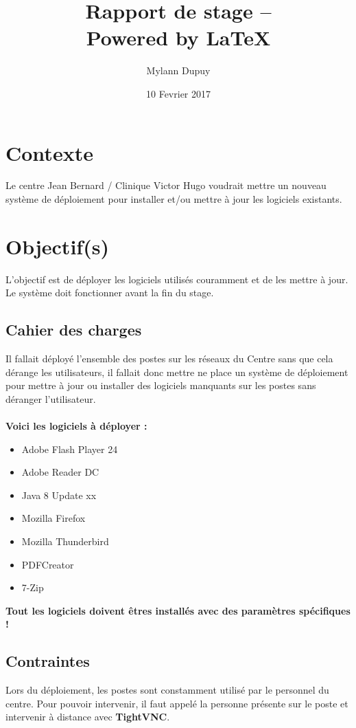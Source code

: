 \documentclass[11pt,a4paper,oneside]{article}
\author{Mylann Dupuy}
\title{Rapport de stage --  \\ Powered by \LaTeX}
\date{10 Fevrier 2017}
\begin{document}
\maketitle
\newpage
\tableofcontents
\newpage
\section{Contexte}
Le centre Jean Bernard / Clinique Victor Hugo voudrait mettre un nouveau système de déploiement pour installer et/ou mettre à jour les logiciels existants.

\section{Objectif(s)}
L'objectif est de déployer les logiciels utilisés couramment et de les mettre à jour. Le système doit fonctionner avant la fin du stage. 

\subsection{Cahier des charges}
Il fallait déployé l'ensemble des postes sur les réseaux du Centre sans que cela dérange les utilisateurs, il fallait donc mettre ne place un système de déploiement pour mettre à jour ou installer des logiciels manquants sur les postes sans déranger l'utilisateur.\\ \\
\textbf{Voici les logiciels à déployer :}\\

\begin{itemize}
	\item Adobe Flash Player 24
	\item Adobe Reader DC
	\item Java 8 Update xx
	\item Mozilla Firefox
	\item Mozilla Thunderbird
	\item PDFCreator
	\item 7-Zip
\end{itemize}

\begin{center}
\textbf{Tout les logiciels doivent êtres installés avec des paramètres spécifiques !}
\end{center}
\subsection{Contraintes}
Lors du déploiement, les postes sont constamment utilisé par le personnel du centre. Pour pouvoir intervenir, il faut appelé la personne présente sur le poste et intervenir à distance avec \textbf{TightVNC}.
\end{document}
